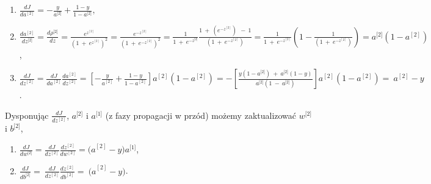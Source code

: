 \begin{enumerate}
\def\labelenumi{\arabic{enumi}.}
\item
    \(\frac{dJ}{da^{\left\lbrack 2 \right\rbrack}} = - \frac{y}{a^{\lbrack 2\rbrack}} + \frac{1 - y}{1 - a^{\lbrack 2\rbrack}},\) 
\item
    \(\frac{da^{\left\lbrack 2 \right\rbrack}}{dz^{\lbrack 2\rbrack}} = \frac{d\rho^{\lbrack 2\rbrack}}{dz} = \frac{e^{z^{\left\lbrack 2 \right\rbrack}}}{\left( 1\  + {\ e}^{z^{\left\lbrack 2 \right\rbrack}} \right)^{2}} = \frac{e^{-z^{\left\lbrack 2 \right\rbrack}}}{\left( 1\  + {\ e}^{-z^{\left\lbrack 2 \right\rbrack}} \right)^{2}} = \frac{1}{1\  + {\ e}^{- z^{\lbrack 2\rbrack}}} \frac{1\  + \ \left( e^{- z^{\left\lbrack 2 \right\rbrack}} \right)\ \  - \ 1}{\left( 1\  + {\ e}^{-
    z^{\left\lbrack 2 \right\rbrack}} \right)} = \frac{1}{1\  + {\ e}^{- z^{\left\lbrack 2 \right\rbrack}}} (1 - \frac{1}{\left( 1\  + {\ e}^{- z^{\left\lbrack 2 \right\rbrack}} \right)}) = a^{\lbrack 2\rbrack}(1 - a^{\left\lbrack 2 \right\rbrack})\),
\item
  \(\frac{dJ}{dz^{\left\lbrack 2 \right\rbrack}} = \frac{dJ}{da^{\left\lbrack 2 \right\rbrack}} \frac{da^{\left\lbrack 2 \right\rbrack}}
  {dz^{\left\lbrack 2 \right\rbrack}} = \left\lbrack - \frac{y}{a^{\left\lbrack 2 \right\rbrack}} + \frac{1 - y}{1 - a^{\left\lbrack 2 \right\rbrack}}
  \right\rbrack a^{\left\lbrack 2 \right\rbrack}\left( 1 - a^{\left\lbrack 2 \right\rbrack} \right) = - \left\lbrack \frac{y\left( 1 - a^{\lbrack 2\rbrack} \right)\  + \ a^{\lbrack 2\rbrack}
  \left( 1 - y \right)}{a^{\lbrack 2\rbrack}\left( 1\ -\ a^{\lbrack 2\rbrack} \right)} \right\rbrack a^{\left\lbrack 2 \right\rbrack}
  \left( 1 - a^{\left\lbrack 2 \right\rbrack} \right) = \ a^{\left\lbrack 2 \right\rbrack} - y\).
\end{enumerate}

Dysponując \(\frac{dJ}{dz^{\left\lbrack 2 \right\rbrack}}\),
\(a^{\lbrack 2\rbrack}\) i \(a^{\lbrack 1\rbrack}\) (z fazy propagacji
w przód) możemy zaktualizować \(w^{\lbrack 2\rbrack}\) i
\(b^{\lbrack 2\rbrack}\),

\begin{enumerate}
\def\labelenumi{\arabic{enumi}.}
\setcounter{enumi}{3}
\item
    \(\frac{dJ}{dw^{\lbrack 2\rbrack}} = \frac{dJ}{dz^{\left\lbrack 2 \right\rbrack}} \frac{dz^{\left\lbrack 2 \right\rbrack}}{dw^{\left\lbrack 2 \right\rbrack}} = {(a}^{\left\lbrack 2 \right\rbrack} - y)a^{\lbrack 1\rbrack}\),
\item
    \(\frac{dJ}{db^{\lbrack 2\rbrack}} = \ \frac{dJ}{dz^{\left\lbrack 2 \right\rbrack}} \frac{dz^{\left\lbrack 2 \right\rbrack}}{db^{\left\lbrack 2 \right\rbrack}} = \ {(a}^{\left\lbrack 2 \right\rbrack} - y)\).
\end{enumerate}

